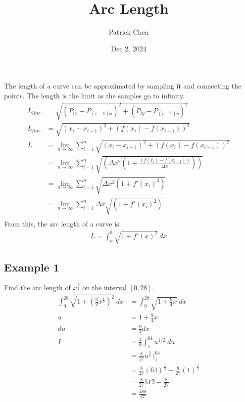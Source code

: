 \documentclass{article}
\title{Arc Length}
\author{Patrick Chen}
\date{Dec 2, 2024}
\theoremstyle{mytheoremstyle}
\theoremstyle{mytheoremstyle}
\theoremstyle{myproblemstyle}
\begin{document}
    \maketitle
    The length of a curve can be approximated by sampling it and connecting the
    points. The length is the limit as the samples go to infinity.
    \begin{align*}
        L_{line} &= \sqrt{(P_{ix} - P_{(i-1)x})^2 + (P_{iy} - P_{(i-1)y})^2} \\
        L_{line} &= \sqrt{(x_i-x_{i-1})^2 + (f(x_i) - f(x_{i-1}))^2} \\
        L &= \lim_{n\to \infty} \sum_{i=1}^{n} \sqrt{(x_i-x_{i-1})^2 + (f(x_i) - f(x_{i-1}))^2} \\
        &= \lim_{n\to \infty} \sum_{i=1}^{n} \sqrt{(\Delta x^2 (1+\frac{(f(x_i)-f(x_{i-1}))}{\Delta x}))} \\
        &= \lim_{n\to \infty} \sum_{i=1}^{n} \sqrt{\Delta x^2 (1 + f'(x_i)^2)} \\
        &= \lim_{n\to \infty} \sum_{i=1}^{n} \Delta x\sqrt{ (1 + f'(x_i)^2)} \\
    \end{align*}
    From this, the arc length of a curve is:
    \begin{align*}
        L = \int_{a}^{b} \sqrt{1+f'(x)^2} \ dx
    \end{align*}

    \subsection*{Example 1}
    Find the arc length of $x^{\frac{3}{2}}$ on the interval $[0,28]$.
    \begin{align*}
        \int_{0}^{28} \sqrt{1+ (\frac{3}{2} x^{\frac{1}{2}})^2} \ dx
        &= \int_{0}^{28} \sqrt{1+ \frac{9}{4} x} \ dx \\
        u &= 1+ \frac{9}{4} x \\
        du &= \frac{9}{4} dx \\
        I &= \frac{4}{9} \int_{1}^{64} u^{1/2} \ du \\
          &= \frac{8}{27} u^{\frac{3}{2}} \ \Big|_{1}^{64} \\
          &= \frac{8}{27} (64)^{\frac{3}{2}} - \frac{8}{27} (1)^{\frac{3}{2}} \\
          &= \frac{8}{27} 512 - \frac{8}{27} \\
          &= \frac{488}{27}
    \end{align*}
\end{document}
